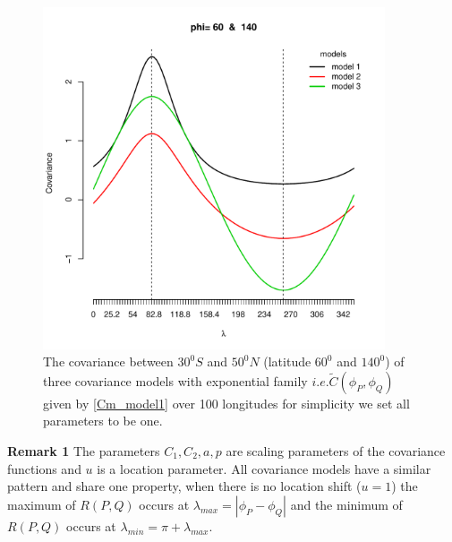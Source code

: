 			\begin{figure}[H]
				\centering
				\includegraphics[width=0.9\textwidth]{graphs/all_covariance_models}
				\caption[The covariance between $30^0S$ and $50^0N$ (latitude $60^0$ and $140^0$) of three covariance models] {The covariance between $30^0S$ and $50^0N$ (latitude $60^0$ and $140^0$) of three covariance models with exponential family $ i.e. \tilde{C}(\phi_P, \phi_Q)$ given by \ref{Cm_model1} over 100 longitudes  for simplicity we set all parameters to be one.}
			\end{figure}
				
			{\bf Remark 1} The parameters $C_1, C_2, a, p$ are scaling parameters of the covariance functions and $u$ is a location parameter. All covariance models have a similar pattern and share one property, when there is no location shift ($u = 1$) the maximum of $R(P,Q)$ occurs at $\lambda_{max} = |\phi_P -\phi_Q|$ and the minimum of $R(P,Q)$ occurs at $\lambda_{min} = \pi + \lambda_{max}$. 
					
